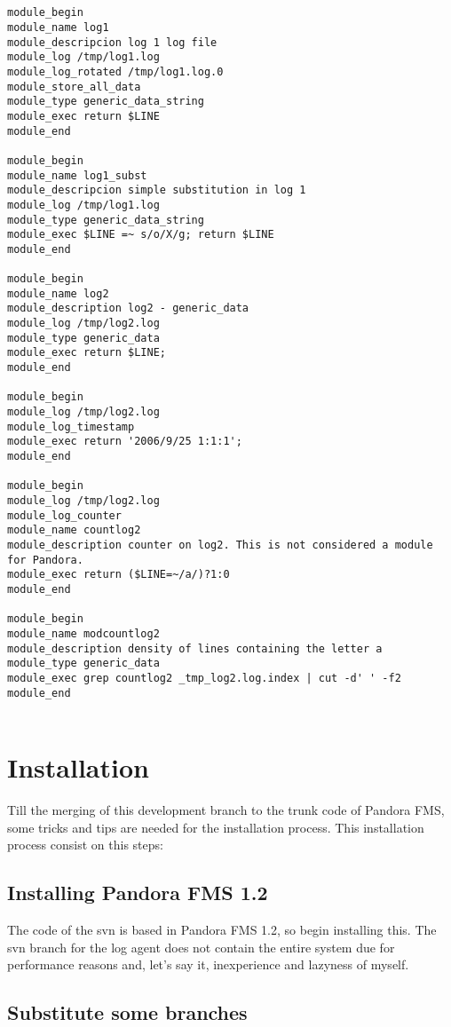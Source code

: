 \documentclass[a4paper,10pt]{article}
\begin{document}
\begin{verbatim}

    
module_begin
module_name log1
module_descripcion log 1 log file
module_log /tmp/log1.log
module_log_rotated /tmp/log1.log.0
module_store_all_data
module_type generic_data_string
module_exec return $LINE
module_end

module_begin
module_name log1_subst
module_descripcion simple substitution in log 1
module_log /tmp/log1.log
module_type generic_data_string
module_exec $LINE =~ s/o/X/g; return $LINE
module_end

module_begin
module_name log2
module_description log2 - generic_data
module_log /tmp/log2.log
module_type generic_data
module_exec return $LINE;
module_end

module_begin
module_log /tmp/log2.log
module_log_timestamp
module_exec return '2006/9/25 1:1:1';
module_end

module_begin
module_log /tmp/log2.log
module_log_counter
module_name countlog2
module_description counter on log2. This is not considered a module for Pandora.
module_exec return ($LINE=~/a/)?1:0
module_end

module_begin
module_name modcountlog2
module_description density of lines containing the letter a
module_type generic_data
module_exec grep countlog2 _tmp_log2.log.index | cut -d' ' -f2
module_end


\end{verbatim}


\section{Installation}

Till the merging of this development branch to the trunk code of Pandora FMS, some tricks and tips are needed for the installation process. This installation process consist on this steps:

\subsection{Installing Pandora FMS 1.2}

The code of the svn is based in Pandora FMS 1.2, so begin installing this. The svn branch for the log agent does not contain the entire system due for performance reasons and, let's say it, inexperience and lazyness of myself.

\subsection{Substitute some branches}
\end{document}
